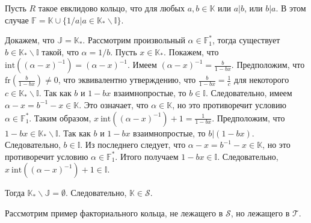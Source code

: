 \documentclass[_00_dissertation.tex]{subfiles}
\begin{document}
\begin{example}\label{example:a|b or b|a}
    Пусть $R$ такое евклидово кольцо, что для любых $a,b\in\mathbb{K}$ или $a|b$, или $b|a$.
    В этом случае $\mathbb{F}=\mathbb{K}\cup\{1/a|a\in\mathbb{K}_{*}\backslash\mathbb{I}\}$.

    Докажем, что $\mathbb{J}=\mathbb{K}_{*}$.
    Рассмотрим произвольный $\alpha\in\mathbb{F}_{1}^{*}$, тогда существует $b\in\mathbb{K}_{*}\backslash\mathbb{I}$ такой, что $\alpha=1/b$.
    Пусть $x\in\mathbb{K}_{*}$.
    Покажем, что $\textrm{int}((\alpha-x)^{-1}) = (\alpha-x)^{-1}$.
    Имеем $(\alpha-x)^{-1}=\frac{b}{1-bx}$.
    Предположим, что $\textrm{fr}(\frac{b}{1-bx}) \neq 0$, что эквивалентно утверждению, что $\frac{b}{1 - b x} = \frac{1}{c}$ для некоторого $c\in\mathbb{K}_{*}\backslash\mathbb{I}$.
    Так как $b$ и $1 - b x$ взаимнопростые, то $b\in\mathbb{I}$.
    Следовательно, имеем $\alpha-x=b^{-1}-x\in\mathbb{K}$.
    Это означает, что $\alpha\in\mathbb{K}$, но это противоречит условию $\alpha \in \mathbb{F}_{1}^{*}$.
    Таким образом, $x\ \textrm{int}((\alpha-x)^{-1})+1=\frac{1}{1-bx}$.
    Предположим, что $1 - b x \in \mathbb{K}_{*}\backslash\mathbb{I}$.
    Так как $b$ и $1-bx$ взаимнопростые, то $b|(1-bx)$.
    Следовательно, $b\in\mathbb{I}$.
    Из последнего следует, что $\alpha-x=b^{-1}-x\in\mathbb{K}$, но это противоречит условию $\alpha\in\mathbb{F}_{1}^{*}$.
    Итого получаем $1-bx\in\mathbb{I}$.
    Следовательно, $x\ \textrm{int}((\alpha-x)^{-1}) + 1 \in \mathbb{I}$.
    
    Тогда $\mathbb{K}_{*}\backslash\mathbb{J} = \emptyset$.
    Следовательно, $\mathbb{K}\in \mathcal{S}$.
\end{example}

Рассмотрим пример факториального кольца, не лежащего в $\mathcal{S}$, но лежащего в $\mathcal{T}$.
\end{document}
